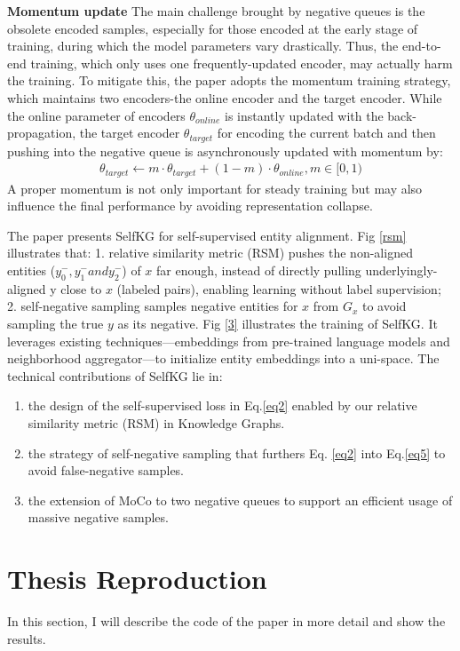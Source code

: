 \documentclass[sigconf]{acmart}
\begin{document}
{\noindent \textbf{Momentum update} The main challenge brought by negative queues is the obsolete encoded samples, especially for those encoded at the early stage of training, during which the model parameters vary drastically. Thus, the end-to-end training,  which only uses one frequently-updated encoder, may actually harm the training. To mitigate this, the paper adopts the momentum training strategy, which maintains two encoders-the online encoder and the target encoder. While the online parameter of encoders $\theta_{online}$ is instantly updated with the back-propagation, the target encoder $\theta_{target}$ for encoding the current batch and then pushing into the negative queue is asynchronously updated with momentum by:
\begin{gather}
    \theta _{target}\longleftarrow m \cdot \theta _{target} +(1-m)\cdot\theta _{online},m\in[0,1) 
\end{gather}
A proper momentum is not only important for steady training but may also influence the final performance by avoiding representation collapse.

The paper presents SelfKG for self-supervised entity alignment. Fig \ref{rsm} illustrates that: 1. relative similarity metric (RSM) pushes the non-aligned entities ($y^{-}_0 , y^{-}_1 and y^{-}_2$) of $x$ far enough, instead of directly pulling underlyingly-aligned y close to $x$ (labeled pairs), enabling learning without label supervision; 2. self-negative sampling samples negative entities for $x$ from $G_x$ to avoid sampling the true $y$ as its negative. Fig \ref{3} illustrates the training of SelfKG. It leverages existing techniques—embeddings from pre-trained language models and neighborhood aggregator—to initialize entity embeddings into a uni-space. The technical contributions of SelfKG lie in:
\begin{enumerate}
    \item the design of the self-supervised loss in Eq.\ref{eq2} enabled by our relative similarity metric (RSM) in Knowledge Graphs.
    \item the strategy of self-negative sampling that furthers Eq. \ref{eq2} into Eq.\ref{eq5} to avoid false-negative samples.
    \item the extension of MoCo to two negative queues to support an efficient usage of massive negative samples.
\end{enumerate}
\section{Thesis Reproduction}
In this section, I will describe the code of the paper in more detail and show the results.
}
\end{document}
